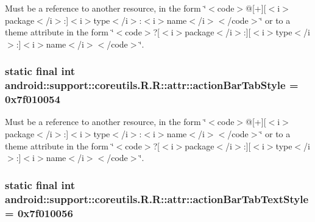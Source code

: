 Must be a reference to another resource, in the form \char`\"{}$<$code$>$@\mbox{[}+\mbox{]}\mbox{[}$<$i$>$package$<$/i$>$:\mbox{]}$<$i$>$type$<$/i$>$:$<$i$>$name$<$/i$>$$<$/code$>$\char`\"{} or to a theme attribute in the form \char`\"{}$<$code$>$?\mbox{[}$<$i$>$package$<$/i$>$:\mbox{]}\mbox{[}$<$i$>$type$<$/i$>$:\mbox{]}$<$i$>$name$<$/i$>$$<$/code$>$\char`\"{}. \hypertarget{classandroid_1_1support_1_1coreutils_1_1_r_1_1attr_9af3b49c39f9ceb066e62266284be787}{
\subsubsection[{actionBarTabStyle}]{\setlength{\rightskip}{0pt plus 5cm}static final int android::support::coreutils.R.R::attr::actionBarTabStyle = 0x7f010054}}
\label{classandroid_1_1support_1_1coreutils_1_1_r_1_1attr_9af3b49c39f9ceb066e62266284be787}


Must be a reference to another resource, in the form \char`\"{}$<$code$>$@\mbox{[}+\mbox{]}\mbox{[}$<$i$>$package$<$/i$>$:\mbox{]}$<$i$>$type$<$/i$>$:$<$i$>$name$<$/i$>$$<$/code$>$\char`\"{} or to a theme attribute in the form \char`\"{}$<$code$>$?\mbox{[}$<$i$>$package$<$/i$>$:\mbox{]}\mbox{[}$<$i$>$type$<$/i$>$:\mbox{]}$<$i$>$name$<$/i$>$$<$/code$>$\char`\"{}. \hypertarget{classandroid_1_1support_1_1coreutils_1_1_r_1_1attr_fd549cfab4d51df1cc62c896ced31466}{
\subsubsection[{actionBarTabTextStyle}]{\setlength{\rightskip}{0pt plus 5cm}static final int android::support::coreutils.R.R::attr::actionBarTabTextStyle = 0x7f010056}}
\label{classandroid_1_1support_1_1coreutils_1_1_r_1_1attr_fd549cfab4d51df1cc62c896ced31466}


